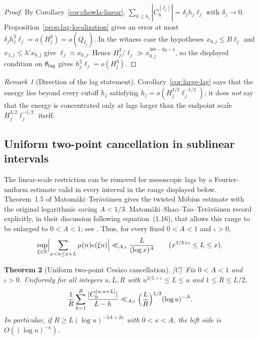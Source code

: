 \documentclass[11pt,reqno]{amsart}
\numberwithin{equation}{section}
\theoremstyle{plain}
\newtheorem{theorem}{Theorem}[section]
\theoremstyle{definition}
\theoremstyle{remark}
\newtheorem{remark}[theorem]{Remark}
\newcommand{\tagC}{\textup{[C]}}
\begin{document}
\begin{proof}
By Corollary~\ref{cor:chowla-linear},
$\sum_{h\le h_j}|C^{(I_j)}_h|=\delta_jh_j\ell_j$ with $\delta_j\to0$.
Proposition~\ref{prop:lag-localization} gives an error at most
$\delta_jh_j^2\ell_j=o(H_j^3)=o(Q_{I_j})$. In the witness case the hypotheses
$x_{0,j}\le B\ell_j$ and $x_{1,j}\le\lambda' x_{0,j}$ give
$\ell_j\asymp x_{0,j}$.  Hence
$H_j^3/\ell_j\gg x_{0,j}^{3\Theta-3\eta-1}$, so the displayed condition on
$\theta_{\rm lag}$ gives $h_j^2\ell_j=o(H_j^3)$.
\end{proof}

\begin{remark}[Direction of the lag statement]
\label{rem:large-lag-direction}
Corollary~\ref{cor:large-lag} says that the energy lies beyond every cutoff
$h_j$ satisfying $h_j=o(H_j^{3/2}\ell_j^{-1/2})$; it does \emph{not} say
that the energy is concentrated only at lags larger than the endpoint scale
$H_j^{3/2}\ell_j^{-1/2}$ itself.
\end{remark}

\subsection{Uniform two-point cancellation in sublinear intervals}
\label{subsec:sublinear-chowla}

The linear-scale restriction can be removed for mesoscopic lags by a
Fourier-uniform estimate valid in every interval in the range displayed
below. Theorem~1.5 of Matom\"aki--Ter\"av\"ainen
\cite{MatomakiTeravainen2023} gives the twisted M\"obius estimate with the
original logarithmic saving $A<1/3$. Matom\"aki--Shao--Tao--Ter\"av\"ainen
record explicitly, in their discussion following equation~(1.16), that
\cite[Remark~5.2]{MatomakiTeravainen2023} allows this range to be enlarged
to $0<A<1$; see \cite[discussion following (1.16)]{MSTT23}. Thus, for
every fixed $0<A<1$ and $\iota>0$,
\begin{equation}
\label{eq:MT-fourier}
\sup_{\xi\in\mathbb R}\Bigl|\sum_{x<n\le x+L}\mu(n)e(\xi n)\Bigr|
\ll_{A,\iota}\frac{L}{(\log x)^A}
\qquad(x^{3/5+\iota}\le L\le x).
\end{equation}

\begin{theorem}[Uniform two-point Ces\`aro cancellation]
\label{thm:sublinear-two-point}
\tagC\ Fix $0<A<1$ and $\iota>0$. Uniformly for all integers $u,L,R$ with
$u^{3/5+\iota}\le L\le u$ and $1\le R\le L/2$,
\begin{equation}
\label{eq:sublinear-two-point}
\frac1R\sum_{h=1}^{R}\frac{|C^{(u,u+L]}_h|}{L-h}
\ll_{A,\iota}\Bigl(\frac LR\Bigr)^{1/2}(\log u)^{-A}.
\end{equation}
In particular, if $R\ge L(\log u)^{-2A+2\kappa}$ with
$0<\kappa<A$, the left side is $O((\log u)^{-\kappa})$.
\end{theorem}
\end{document}
